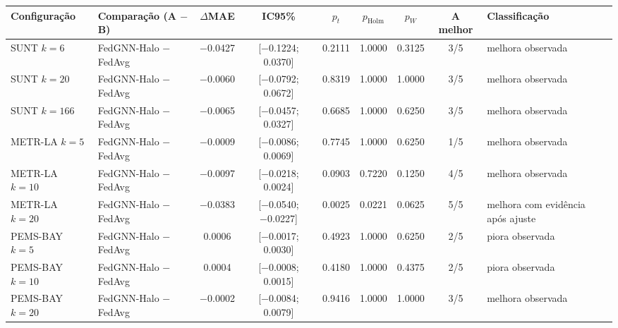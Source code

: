 
\begin{tabular}{>{\raggedright\arraybackslash}l>{\raggedright\arraybackslash}p{3.3cm}cccccc>{\raggedright\arraybackslash}p{3.3cm}}
\toprule
Configuração & Comparação (A $-$ B) & $\Delta$MAE & IC95\% & $p_t$ & $p_{\mathrm{Holm}}$ & $p_W$ & A melhor & Classificação \\
\midrule
SUNT $k=6$ & FedGNN-Halo − FedAvg & \num{-0.0427} & [\num{-0.1224}; \num{+0.0370}] & \num{0.2111} & \num{1.0000} & \num{0.3125} & 3/5 & melhora observada \\
SUNT $k=20$ & FedGNN-Halo − FedAvg & \num{-0.0060} & [\num{-0.0792}; \num{+0.0672}] & \num{0.8319} & \num{1.0000} & \num{1.0000} & 3/5 & melhora observada \\
SUNT $k=166$ & FedGNN-Halo − FedAvg & \num{-0.0065} & [\num{-0.0457}; \num{+0.0327}] & \num{0.6685} & \num{1.0000} & \num{0.6250} & 3/5 & melhora observada \\
METR-LA $k=5$ & FedGNN-Halo − FedAvg & \num{-0.0009} & [\num{-0.0086}; \num{+0.0069}] & \num{0.7745} & \num{1.0000} & \num{0.6250} & 1/5 & melhora observada \\
METR-LA $k=10$ & FedGNN-Halo − FedAvg & \num{-0.0097} & [\num{-0.0218}; \num{+0.0024}] & \num{0.0903} & \num{0.7220} & \num{0.1250} & 4/5 & melhora observada \\
METR-LA $k=20$ & FedGNN-Halo − FedAvg & \num{-0.0383} & [\num{-0.0540}; \num{-0.0227}] & \num{0.0025} & \num{0.0221} & \num{0.0625} & 5/5 & melhora com evidência após ajuste \\
PEMS-BAY $k=5$ & FedGNN-Halo − FedAvg & \num{+0.0006} & [\num{-0.0017}; \num{+0.0030}] & \num{0.4923} & \num{1.0000} & \num{0.6250} & 2/5 & piora observada \\
PEMS-BAY $k=10$ & FedGNN-Halo − FedAvg & \num{+0.0004} & [\num{-0.0008}; \num{+0.0015}] & \num{0.4180} & \num{1.0000} & \num{0.4375} & 2/5 & piora observada \\
PEMS-BAY $k=20$ & FedGNN-Halo − FedAvg & \num{-0.0002} & [\num{-0.0084}; \num{+0.0079}] & \num{0.9416} & \num{1.0000} & \num{1.0000} & 3/5 & melhora observada \\
\bottomrule
\end{tabular}
